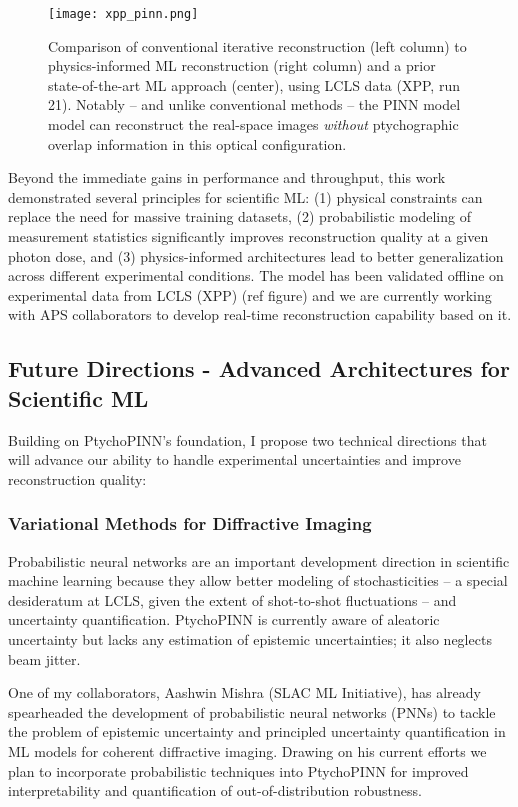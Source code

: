 \documentclass{article}
\begin{document}
\begin{figure}[htbp]
    \centering
    \texttt{[image: xpp\_pinn.png]}
    \caption{Comparison of conventional iterative reconstruction (left column) to physics-informed ML reconstruction (right column) and a prior state-of-the-art ML approach (center), using LCLS data (XPP, run 21). Notably -- and unlike conventional methods -- the PINN model model can reconstruct the real-space images \emph{without} ptychographic overlap information in this optical configuration.}
    \label{fig:comparison}
\end{figure}
Beyond the immediate gains in performance and throughput, this work demonstrated several principles for scientific ML: (1) physical constraints can replace the need for massive training datasets, (2) probabilistic modeling of measurement statistics significantly improves reconstruction quality at a given photon dose, and (3) physics-informed architectures lead to better generalization across different experimental conditions. The model has been validated offline on experimental data from LCLS (XPP) (ref figure) and we are currently working with APS collaborators to develop real-time reconstruction capability based on it. 

\subsection{Future Directions - Advanced Architectures for Scientific ML}
Building on PtychoPINN's foundation, I propose two technical directions that will advance our ability to handle experimental uncertainties and improve reconstruction quality:

\subsubsection{Variational Methods for Diffractive Imaging}
Probabilistic neural networks are an important development direction in scientific machine learning because they allow better modeling of stochasticities -- a special desideratum at LCLS, given the extent of shot-to-shot fluctuations -- and uncertainty quantification. PtychoPINN is currently aware of aleatoric uncertainty but lacks any estimation of epistemic uncertainties; it also neglects beam jitter. 

One of my collaborators, Aashwin Mishra (SLAC ML Initiative), has already spearheaded the development of probabilistic neural networks (PNNs) to tackle the problem of epistemic uncertainty and principled uncertainty quantification in ML models for coherent diffractive imaging. Drawing on his current efforts we plan to incorporate probabilistic techniques into PtychoPINN for improved interpretability and quantification of out-of-distribution robustness. \cite{hoidn2024probabilistic}
\end{document}
